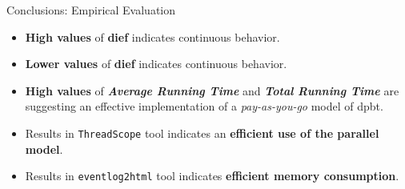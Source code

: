 \begin{frame}[fragile]{Conclusions: Empirical Evaluation}
  \begin{itemize}
    \setlength\itemsep{1.5em}
    \item \textbf{High values} of \textbf{dief\@t} indicates continuous behavior.
    \item \textbf{Lower values} of \textbf{dief\@k} indicates continuous behavior.
    \item \textbf{High values} of \textbf{\emph{Average Running Time}} and \textbf{\emph{Total Running Time}} are suggesting an effective implementation of a \emph{pay-as-you-go} model of \acrshort{dpbt}.
    \item Results in \texttt{ThreadScope} tool indicates an \textbf{efficient use of the parallel model}.
    \item Results in \texttt{eventlog2html} tool indicates \textbf{efficient memory consumption}.
  \end{itemize} 
\end{frame}

